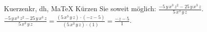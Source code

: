 \begin{MAufgabe}{Kuerzen}{kr, dh, MaTeX}
K\"urzen Sie soweit m\"oglich: $\frac{ - 5\, y\, x^3\, z^2 - 25\, y\, x^3\, z}{5\, x^3\, y\, z}$.\\ 
\ifLsg\MLoesung
\quad $\frac{ - 5\, y\, x^3\, z^2 - 25\, y\, x^3\, z}{5\, x^3\, y\, z}=\frac{(5\, x^3\, y\, z)\cdot( - z - 5)}{(5\, x^3\, y\, z)\cdot(1)}=\frac{ - z - 5}{1}$.\else\relax\fi
 \end{MAufgabe}